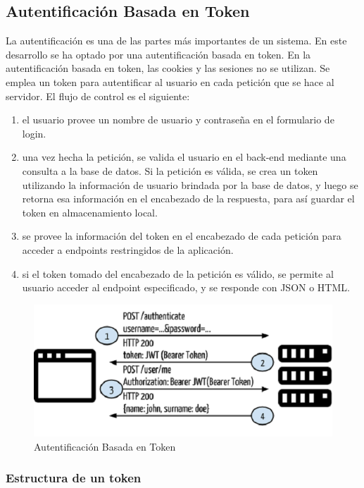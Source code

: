 \subsection{Autentificación Basada en Token}

La autentificación es una de las partes más importantes de un sistema. En este desarrollo se ha optado por una autentificación basada en token. En la autentificación basada en token, las cookies y las sesiones no se utilizan. Se emplea un token para autentificar al usuario en cada petición que se hace al servidor. El flujo de control es el siguiente:
\begin{enumerate}[1.]
	\item el usuario provee un nombre de usuario y contraseña en el formulario de login.
	\item una vez hecha la petición, se valida el usuario en el back-end mediante una consulta a la base de datos. Si la petición es válida, se crea un token utilizando la información de usuario brindada por la base de datos, y luego se retorna esa información en el encabezado de la respuesta, para así guardar el token en almacenamiento local.
	\item se provee la información del token en el encabezado de cada petición para acceder a endpoints restringidos de la aplicación.
	\item si el token tomado del encabezado de la petición es válido, se permite al usuario acceder al endpoint especificado, y se responde con JSON o HTML.
\end{enumerate}

\begin{figure}[H]
	\centering\includegraphics[scale=0.7]{imagenes/token.png}
	\caption{Autentificación Basada en Token}
	\label{token}
\end{figure}

\newpage

\subsubsection{Estructura de un token}

